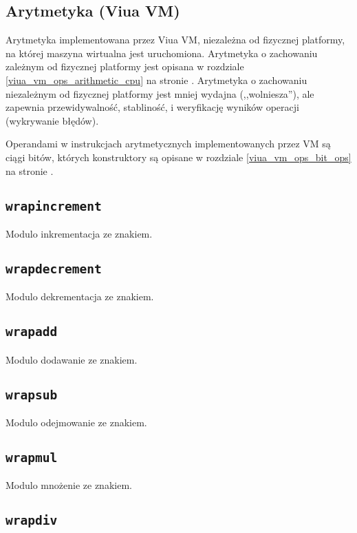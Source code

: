 \subsection{Arytmetyka (Viua VM)}
\label{viua_vm_ops_arithmetic_vm}

Arytmetyka implementowana przez Viua VM, niezależna od fizycznej platformy, na
której maszyna wirtualna jest uruchomiona. Arytmetyka o zachowaniu zależnym od
fizycznej platformy jest opisana w rozdziale \ref{viua_vm_ops_arithmetic_cpu} na
stronie \pageref{viua_vm_ops_arithmetic_cpu}. Arytmetyka o zachowaniu
niezależnym od fizycznej platformy jest mniej wydajna (,,wolniesza''), ale
zapewnia przewidywalność, stabliność, i weryfikację wyników operacji (wykrywanie
błędów).

Operandami w instrukcjach arytmetycznych implementowanych przez VM są ciągi
bitów, których konstruktory są opisane w rozdziale \ref{viua_vm_ops_bit_ops} na
stronie \pageref{viua_vm_ops_bit_ops}.

\subsection{\texttt{wrapincrement}}

Modulo inkrementacja ze znakiem.

\subsection{\texttt{wrapdecrement}}

Modulo dekrementacja ze znakiem.

\subsection{\texttt{wrapadd}}

Modulo dodawanie ze znakiem.

\subsection{\texttt{wrapsub}}

Modulo odejmowanie ze znakiem.

\subsection{\texttt{wrapmul}}

Modulo mnożenie ze znakiem.

\subsection{\texttt{wrapdiv}}

